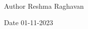 \begin{DoxyAuthor}{Author}
Reshma Raghavan 
\end{DoxyAuthor}
\begin{DoxyDate}{Date}
01-\/11-\/2023 
\end{DoxyDate}
